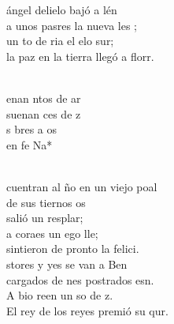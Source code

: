 \documentclass[12pt]{article}
\begin{document}
\begin{multicols*}{2}
\begin{cancion}%
	 ángel delielo bajó a lén\\
	a unos pasres la nueva les ;\\
	un to de ria el elo sur; \\
	la paz en la tierra llegó a florr.\\\jump\\
	\begin{chorus}%
	enan ntos de ar\\
	suenan ces de z\\
	 s bres a os\\
	en fe Na*\\
	\end{chorus}%
	\jump\\
	cuentran al ño en un viejo poal\\
	de sus tiernos os \\
	salió un resplar;\\
	a  coraes un ego lle; \\
	sintieron de pronto la felici.\\
\jump
	stores y yes se van a Ben \\
	cargados de nes postrados esn.\\
	A bio reen un so de z.\\
	El rey de los reyes premió su qur.\\
\end{cancion}%


\end{multicols*}
\end{document}
